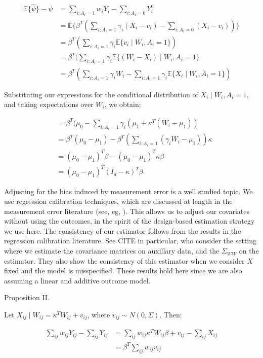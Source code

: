 \documentclass[12pt]{article}
\begin{document}
\begin{align*}
    \mathbb{E}\{\hat{\psi}\} - \psi &= \sum_{i: A_i = 1}w_iY_i - \sum_{i: A_i = 0}Y_i^0 \\
    &= \mathbb{E}\{\beta^T(\sum_{i: A_i = 1} \gamma_i (X_i - v_i) - \sum_{i: A_i = 0} (X_i - v_i))\} \\
    &= \beta^T(\sum_{i: A_i = 1} \gamma_i\mathbb{E}\{v_i \mid W_i, A_i = 1\}) \\
    &= \beta^T(\sum_{i: A_i = 1} \gamma_i\mathbb{E}\{(W_i - X_i) \mid W_i, A_i = 1\} \\
    &= \beta^T(\sum_{i: A_i = 1} \gamma_iW_i - \sum_{i: A_i = 1} \gamma_i\mathbb{E}\{X_i \mid W_i, A_i = 1\})
\end{align*}

Substituting our expressions for the conditional distribution of $X_i \mid W_i, A_i = 1$, and taking expectations over $W_i$, we obtain:

\begin{align*}
    &= \beta^T(\mu_0 - \sum_{i: A_i = 1} \gamma_i(\mu_1 + \kappa^T(W_i - \mu_1)) \\
    &= \beta^T(\mu_0 - \mu_1) - \beta^T(\sum_{i: A_i = 1}(\gamma_iW_i - \mu_1))\kappa \\
    &= (\mu_0 - \mu_1)^T\beta - (\mu_0 - \mu_1)^T\kappa\beta \\
    &= (\mu_0 - \mu_1)^T(I_d - \kappa)^T\beta
\end{align*}

Adjusting for the bias induced by measurement error is a well studied topic. We use regression calibration techniques, which are discussed at length in the measurement error literature (see, eg, \cite{carroll2006measurement}). This allows us to adjust our covariates without using the outcomes, in the spirit of the design-based estimation strategy we use here. The consistency of our estimator follows from the results in the regression calibration literature. See CITE in particular, who consider the setting where we estimate the covariance matrices on auxillary data, and the $\Sigma_{WW}$ on the estimator. They also show the consistency of this estimator when we consider $X$ fixed and the model is misspecified. These results hold here since we are also assuming a linear and additive outcome model.

Proposition II. 

Let $X_{ij} \mid W_{ij} = \kappa^TW_{ij} + v_{ij}$, where $v_{ij} \sim N(0, \Sigma)$. Then: 

\begin{align*}
    \sum_{ij}w_{ij}Y_{ij} - \sum_{ij}Y_{ij} &= \sum_{ij}w_{ij}\kappa^TW_{ij}\beta + v_{ij} - \sum_{ij}X_{ij} \\
    &= \beta^T\sum_{ij}w_{ij}v_{ij}
\end{align*}
\end{document}
